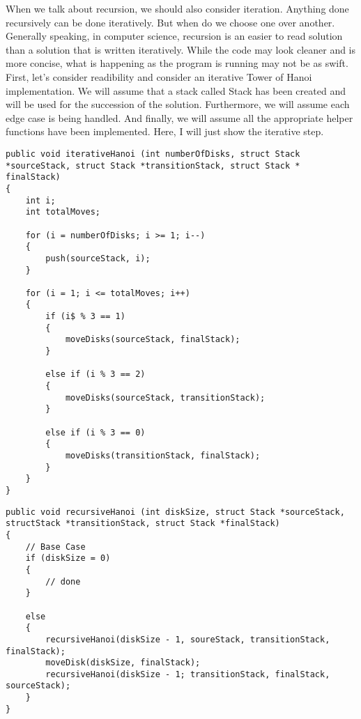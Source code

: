 \documentclass{article}
\begin{document}
When we talk about recursion, we should also consider iteration. Anything done recursively can be done iteratively. But when do we choose one over another. Generally speaking, in computer science, recursion is an easier to read solution than a solution that is written iteratively. While the code may look cleaner and is more concise, what is happening as the program is running may not be as swift. 
First, let's consider readibility and consider an iterative Tower of Hanoi implementation. We will assume that a stack called Stack has been created and will be used for the succession of the solution. Furthermore, we will assume each edge case is being handled. And finally, we will assume all the appropriate helper functions have been implemented.  Here, I will just show the iterative step.
\\
\begin{lstlisting}
public void iterativeHanoi (int numberOfDisks, struct Stack *sourceStack, struct Stack *transitionStack, struct Stack * finalStack)
{
	int i;
	int totalMoves;
	
	for (i = numberOfDisks; i >= 1; i--)
	{
		push(sourceStack, i);
	}
	
	for (i = 1; i <= totalMoves; i++)
	{
		if (i$ % 3 == 1)
		{
			moveDisks(sourceStack, finalStack);
		}
		
		else if (i % 3 == 2)
		{
			moveDisks(sourceStack, transitionStack);
		}
		
		else if (i % 3 == 0)
		{
			moveDisks(transitionStack, finalStack);
		}
	}
}
\end{lstlisting}
\begin{comment} Now, let's consider the recursive case. Again, we will assume everything around this recursive step is implemented correctly. \end{comment}
\begin{lstlisting}
public void recursiveHanoi (int diskSize, struct Stack *sourceStack,   structStack *transitionStack, struct Stack *finalStack)
{
	// Base Case
	if (diskSize = 0)
	{
		// done
	}
	
	else 
	{
		recursiveHanoi(diskSize - 1, soureStack, transitionStack, finalStack);
		moveDisk(diskSize, finalStack);
		recursiveHanoi(diskSize - 1; transitionStack, finalStack, sourceStack);
	}
}
\end{lstlisting}
\end{document}
